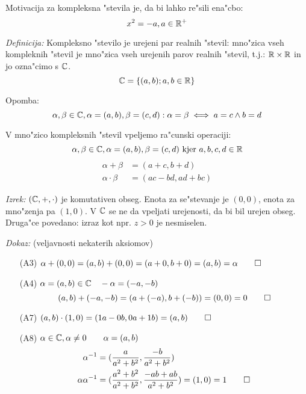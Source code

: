 Motivacija za kompleksna "stevila je, da bi lahko re"sili ena"cbo:
\begin{equation*}
x^2 = -a, a \in \mathbb{R}^+
\end{equation*}

\emph{Definicija:} Kompleksno "stevilo je urejeni par realnih "stevil: mno"zica vseh kompleknih "stevil je mno"zica vseh urejenih parov realnih "stevil, t.j.: $\mathbb{R} \times \mathbb{R}$ in jo ozna"cimo s $\mathbb{C}$.
\begin{equation*}
\mathbb{C} = \{(a, b); a, b \in \mathbb{R} \}
\end{equation*}

Opomba:
\begin{equation*}
\alpha, \beta \in \mathbb{C}, \alpha = (a, b), \beta = (c, d): \alpha = \beta \iff a = c \land b = d
\end{equation*}

V mno"zico kompleksnih "stevil vpeljemo ra"cunski operaciji:
\begin{equation*}
\alpha, \beta \in \mathbb{C}, \alpha = (a, b), \beta = (c, d) \text{ kjer } a, b, c, d \in \mathbb{R}
\end{equation*}
\begin{align*}
\alpha + \beta &= (a + c, b + d)\\
\alpha \cdot \beta &= (ac - bd, ad + bc)
\end{align*}

\emph{Izrek:} $(\mathbb{C}, +, \cdot)$ je komutativen obseg. Enota za se"stevanje je $(0, 0)$, enota za mno"zenja pa $(1, 0)$. V $\mathbb{C}$ se ne da vpeljati urejenosti, da bi bil urejen obseg. Druga"ce povedano: izraz kot npr. $z > 0$ je nesmiselen.

\emph{Dokaz:} (veljavnosti nekaterih aksiomov)
\begin{itemize}
	\item[(A3)] $\alpha + (0, 0) = (a, b) + (0, 0) = (a + 0, b + 0) = (a, b) = \alpha \qed$
	\item[(A4)] $\alpha = (a, b) \in \mathbb{C} \quad -\alpha = (-a, -b)$
	\begin{equation*}
	(a, b) + (-a, -b) = (a + (-a), b + (-b)) = (0, 0) = 0 \qed
	\end{equation*}
	
	\item[(A7)] $(a, b) \cdot (1, 0) = (1a - 0b, 0a + 1b) = (a, b) \qed$
	\item[(A8)] $\alpha \in \mathbb{C}, \alpha \neq 0 \qquad \alpha = (a, b)$
	\begin{align*}
	\alpha^{-1} &= (\dfrac{a}{a^2 + b^2}, \dfrac{-b}{a^2 + b^2})\\
	\alpha \alpha^{-1} &= (\dfrac{a^2 + b^2}{a^2 + b^2}, \dfrac{-ab + ab}{a^2 + b^2}) = (1, 0) = 1 \qed
	\end{align*}
\end{itemize}

